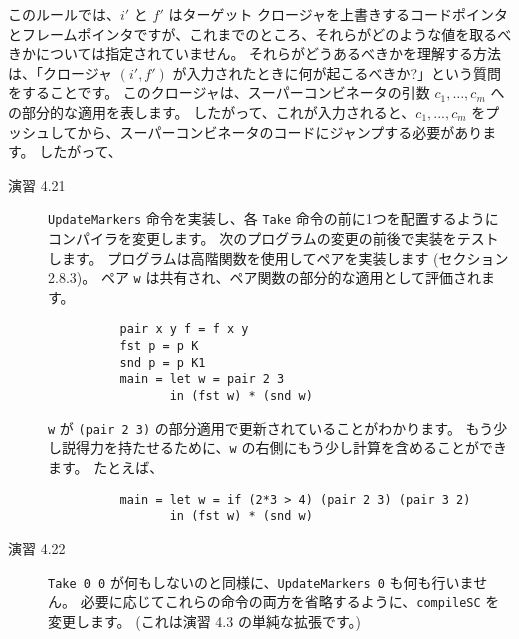 \documentclass{jarticle}
\begin{document}
このルールでは、$i'$ と $f'$ はターゲット クロージャを上書きするコードポインタとフレームポインタですが、これまでのところ、それらがどのような値を取るべきかについては指定されていません。
それらがどうあるべきかを理解する方法は、「クロージャ $(i', f')$ が入力されたときに何が起こるべきか?」という質問をすることです。
このクロージャは、スーパーコンビネータの引数 $c_1, \ldots, c_m$ への部分的な適用を表します。
したがって、これが入力されると、$c_1, ..., c_m$ をプッシュしてから、スーパーコンビネータのコードにジャンプする必要があります。
したがって、


\begin{description}
	\item[演習 4.21] \texttt{UpdateMarkers} 命令を実装し、各 \texttt{Take} 命令の前に1つを配置するようにコンパイラを変更します。
		次のプログラムの変更の前後で実装をテストします。
		プログラムは高階関数を使用してペアを実装します (セクション 2.8.3)。
		ペア \texttt{w} は共有され、ペア関数の部分的な適用として評価されます。
		\begin{verbatim}
          pair x y f = f x y
          fst p = p K
          snd p = p K1
          main = let w = pair 2 3
                 in (fst w) * (snd w)
        \end{verbatim}
		\texttt{w} が \texttt{(pair 2 3)} の部分適用で更新されていることがわかります。
		もう少し説得力を持たせるために、\texttt{w} の右側にもう少し計算を含めることができます。
		たとえば、
		\begin{verbatim}
          main = let w = if (2*3 > 4) (pair 2 3) (pair 3 2)
                 in (fst w) * (snd w)
        \end{verbatim}
	\item[演習 4.22] \texttt{Take 0 0} が何もしないのと同様に、\texttt{UpdateMarkers 0} も何も行いません。
		必要に応じてこれらの命令の両方を省略するように、\texttt{compileSC} を変更します。
		(これは演習 4.3 の単純な拡張です。)
\end{description}
\end{document}
